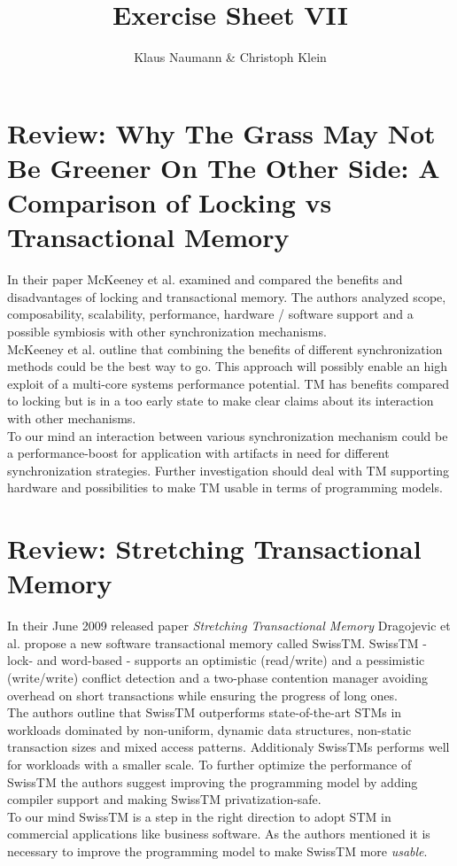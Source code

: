 \documentclass[oneside,a4paper]{scrartcl}
\begin{document}

\title{Exercise Sheet VII}
\subject{Advanced Parallel Computing}
\author{Klaus Naumann \& Christoph Klein}
\maketitle

\section{Review: Why The Grass May Not Be Greener On The Other Side: A Comparison of Locking vs Transactional Memory}
In their paper McKeeney et al. examined and compared the benefits and disadvantages of 
locking and transactional memory. The authors analyzed scope, composability, scalability, 
performance, hardware / software support and a possible symbiosis with other synchronization 
mechanisms.
\\
McKeeney et al. outline that combining the benefits of different synchronization methods 
could be the best way to go. This approach will possibly enable an high exploit of a multi-core 
systems performance potential. TM has benefits compared to locking but is in a too early 
state to make clear claims about its interaction with other mechanisms.
\\
To our mind an interaction between various synchronization mechanism could be a 
performance-boost for application with artifacts in need for different synchronization strategies. 
Further investigation should deal with TM supporting hardware and possibilities to make TM 
usable in terms of programming models.
     
\section{Review: Stretching Transactional Memory}
In their June 2009 released paper \emph{Stretching Transactional Memory} Dragojevic et al. 
propose a new software transactional memory called SwissTM. SwissTM - lock- and 
word-based - supports an optimistic (read/write) and a pessimistic (write/write) conflict 
detection and a two-phase contention manager avoiding overhead on short transactions while 
ensuring the progress of long ones.
\\
The authors outline that SwissTM outperforms state-of-the-art STMs in workloads dominated by 
non-uniform, dynamic data structures, non-static transaction sizes and mixed access patterns. 
Additionaly SwissTMs performs well for workloads with a smaller scale. To further optimize the 
performance of SwissTM the authors suggest improving the programming model by adding compiler 
support and making SwissTM privatization-safe.
\\
To our mind SwissTM is a step in the right direction to adopt STM in commercial applications 
like business software. As the authors mentioned it is necessary to improve the programming model 
to make SwissTM more \emph{usable}.
  
\end{document}
